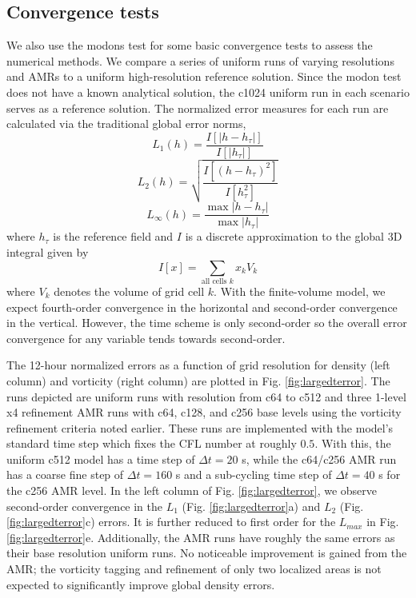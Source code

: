 \subsection{Convergence tests}
We also use the modons test for some basic convergence tests
to assess the numerical methods. We compare
a series of uniform runs of varying resolutions and AMRs to
a uniform high-resolution reference solution. Since the modon test does not
have a known analytical solution, the c1024 uniform run in each scenario serves as
a reference solution. 
The normalized error measures for each run are
calculated via the traditional global error norms,
\begin{equation}
   \label{eq:l1_3d} L_1(h) = \frac{I\left[|h-h_\tau|\right]}{I\left[|h_\tau|\right]}
\end{equation}
\begin{equation}
   \label{eq:l2_3d} L_2(h) = \sqrt{\frac{I\left[(h-h_\tau)^2\right]}{I\left[h_\tau^2\right]}}
\end{equation}
\begin{equation}
   \label{eq:lmax_3d} L_\infty(h) = \frac{\max|h-h_\tau|}{\max|h_\tau|}
\end{equation}
where $h_\tau$ is the reference field and $I$ is a discrete approximation
to the global 3D integral given by
\begin{equation}
    \label{eq:globint_ed} I[x] = \sum_{\text{all cells } k} x_k V_k
\end{equation}
where $V_k$ denotes the volume of grid cell $k$.
With the finite-volume model, we expect fourth-order
convergence in the horizontal and second-order convergence in the vertical. However,
the time scheme is only second-order so the overall error convergence for any variable
tends towards second-order.

The 12-hour normalized errors as a function of grid resolution for density (left column) 
and vorticity (right column) are plotted in Fig. \ref{fig:largedterror}.
The runs depicted are uniform runs with resolution from c64 to c512
and three 1-level  x4 refinement AMR runs with c64, c128, and c256 base levels using the vorticity refinement criteria noted earlier.
These runs are implemented with the model's standard time step which fixes the CFL number at roughly $0.5$. With this,
the uniform c512 model has a time step of $\Delta t=20$ s, while the c64/c256 AMR run has a coarse fine step of $\Delta t =160$ s
and a sub-cycling time step of $\Delta t=40$ s for the c256 AMR level.  In the left column of Fig. \ref{fig:largedterror},
we observe second-order convergence in the $L_1$ (Fig. \ref{fig:largedterror}a) and $L_2$ (Fig. \ref{fig:largedterror}c) errors.
It is further reduced to first order for the $L_{max}$ in Fig. \ref{fig:largedterror}e.  Additionally, the AMR runs have roughly the same
errors as their base resolution uniform runs. No noticeable improvement is gained from the AMR; 
the vorticity tagging and refinement of only two localized areas is not 
expected to significantly improve global density errors.

